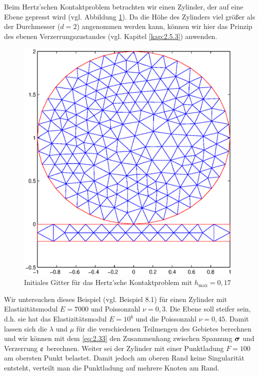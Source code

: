 \begin{bsp}\label{bsp:6.4}
Beim Hertz'schen Kontaktproblem betrachten wir einen Zylinder, der auf eine Ebene gepresst wird (vgl. Abbildung \ref{abb:6.10}). Da die Höhe des Zylinders viel größer als der Durchmesser ($d=2$) angenommen werden kann, können wir hier das Prinzip des ebenen Verzerrungszustandes (vgl. Kapitel \ref{kap:2.5.3}) anwenden. 

\begin{figure}[ht]
\begin{center}
\includegraphics[width=11cm]{Abbildungen/example_4_0,4_depth_6/initial_mesh.eps}
\end{center}
\caption[Darstellung von Beispiel \ref{bsp:6.4} ()]{Initiales Gitter für das Hertz'sche Kontaktproblem mit $h_{\text{max}} = 0,17$\label{abb:6.10}}
\end{figure}

Wir untersuchen dieses Beispiel (vgl. \cite{CarWri} Beispiel 8.1) für einen Zylinder mit Elastizitätsmodul $E = 7000$ und Poissonzahl $\nu = 0,3$. Die Ebene soll steifer sein, d.h. sie hat das Elastizitätsmodul $E = 10^6$ und die Poissonzahl $\nu = 0,45$. Damit lassen sich die  $\lambda$ und $\mu$  für die verschiedenen Teilmengen des Gebietes berechnen und wir können mit dem  \eqref{eq:2.33} den Zusammenhang zwischen Spannung $\boldsymbol \sigma$ und Verzerrung $\boldsymbol {\varepsilon}$ berechnen. Weiter sei der Zylinder mit einer Punktladung $F=100$ am obersten Punkt belastet. Damit jedoch am oberen Rand keine Singularität entsteht, verteilt man die Punktladung auf mehrere Knoten am Rand.


\end{bsp}

